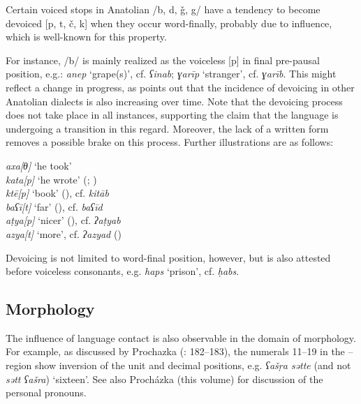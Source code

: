 \documentclass[output=paper]{langsci/langscibook}
\begin{document}
Certain voiced stops in Anatolian  /b, d, ǧ, g/ have a tendency to become devoiced [p, t, č, k] when they occur word-finally, probably due to  influence, which is well-known for this property.

For instance, /b/ is mainly realized as the voiceless [p] in final pre-pausal position, e.g.: \textit{anep} `grape(s)',
cf.  \textit{ʕinab}; \textit{ɣarīp} `stranger', cf.  \textit{ɣarīb}. This might reflect a change in progress, as \cite{Lahdo2009} points out that the incidence of {devoicing} in other Anatolian dialects is also increasing over time. Note that the {devoicing} process does not take place in all instances, supporting the claim that the language is
undergoing a transition in this regard. Moreover, the lack of a written form removes a possible brake on this process. Further illustrations are as follows:

\ea
\noindent \textit{axa[θ]} `he took’\\
\textit{kata[p]} `he wrote’ (; \citealt[90]{Jastrow2011anatolian})\\
\textit{kt\={e}[p]} `book' (), cf.  \textit{kit\={a}b}\\
\textit{baʕī[t]} `far' (), cf.  \textit{baʕ\={i}d}\\
\textit{a\d{t}ya[p]} `nicer' (), cf.  \textit{ʔa\d{t}yab} \\
\textit{azya[t]} `more', cf.  \textit{ʔazyad} (\citealt[106]{Lahdo2009})\\
\z

\noindent Devoicing is not limited to word-final position, however, but is also attested before voiceless consonants, e.g. \textit{haps} `prison', cf.  \textit{ḥabs}. %

\subsection{Morphology}
The influence of language contact is also observable in the domain of morphology.  For example, as discussed by Prochazka (\citeyear{Procházka2018Anatolian}: 182--183),  the {numerals} 11--19  in the -- region show inversion of the unit and decimal positions, e.g. \textit{ʕašṛa sətte} (and not \textit{sətt ʕašra}) `sixteen'. See also Procházka (this volume) for discussion of the personal pronouns.
\end{document}
